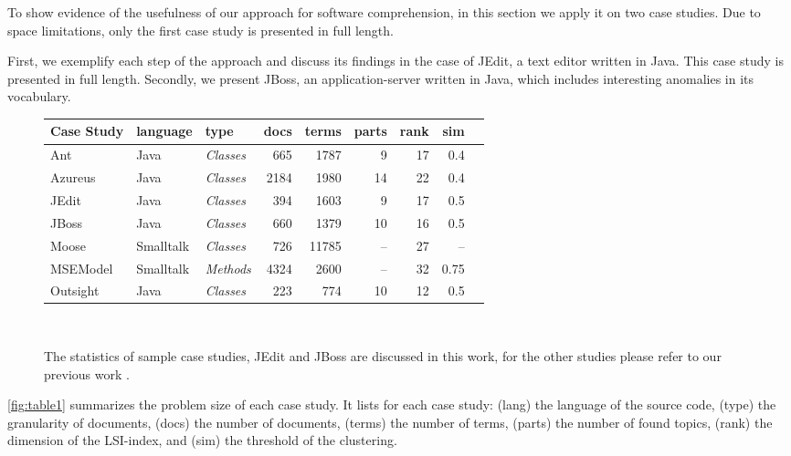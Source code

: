 To show evidence of the usefulness of our approach for software comprehension, in this section we apply it on two case studies. Due to space limitations, only the first case study is presented in full length.

First, we exemplify each step of the approach and discuss its findings in the case of JEdit, a text editor written in Java. This case study is presented in full length. Secondly, we present JBoss, an application-server written in Java, which includes interesting anomalies in its vocabulary.

\begin{figure}[h]
\centering
{\scriptsize
\begin{tabular}{l|llrrrrrr}
\hline
\textbf{Case Study}&\textbf{language}&\textbf{type}&\textbf{docs}&\textbf{terms}
&\textbf{parts}&\textbf{rank}&\textbf{sim}\\
\hline
Ant & Java & \emph{Classes} & 665 & 1787 & 9 & 17 & 0.4\\
Azureus & Java & \emph{Classes}       & 2184 & 1980 & 14 & 22 & 0.4\\
JEdit & Java & \emph{Classes}       & 394  & 1603 & 9 & 17 & 0.5\\
JBoss & Java & \emph{Classes}       & 660 & 1379 & 10 & 16 & 0.5\\
Moose\footnotemark{} & Smalltalk & \emph{Classes}  & 726  & 11785 & -- & 27 & --\\
MSEModel & Smalltalk & \emph{Methods}  & 4324  & 2600 & -- & 32 & 0.75\\
Outsight & Java & \emph{Classes}    & 223 & 774 & 10 & 12 & 0.5\\
\hline
\end{tabular}}\\
\caption{The statistics of sample case studies, JEdit and JBoss are discussed in this work, for the other studies please refer to our previous work \cite{Kuhn05a,Kuhn06a}.}\label{fig:table1}
\end{figure}

\autoref{fig:table1} summarizes the problem size of each case study. It lists for each case study: (lang) the language of the source code, (type) the granularity of  documents, (docs) the number of documents, (terms) the number of terms, (parts) the number of found topics, (rank) the dimension of the LSI-index, and (sim) the threshold  of the clustering.

